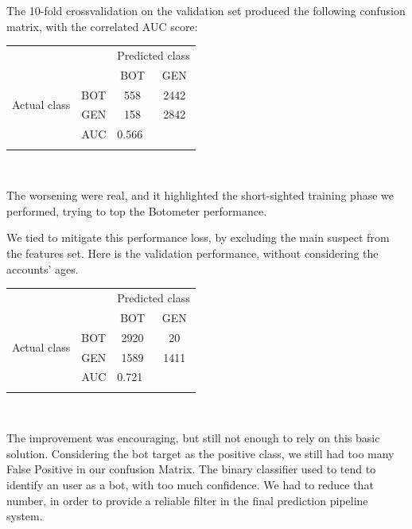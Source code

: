 The 10-fold crossvalidation on the validation set produced the following confusion matrix, with the correlated AUC score:\\

{
	\centering
	\begin{tabular}{@{}cc|cc@{}}
		\multicolumn{1}{c}{} &\multicolumn{1}{c}{} &\multicolumn{2}{c}{Predicted class} \\ 
		\multicolumn{1}{c}{} & 
		\multicolumn{1}{c|}{} & 
		\multicolumn{1}{c}{BOT} & 
		\multicolumn{1}{c}{GEN}  \\
		\cline{2-4}
		\multirow[c]{2}{*}{Actual class}
		& BOT  & 558 & 2442\\
		& GEN  & 158 & 2842\\
		\cline{2-4}
		\multicolumn{2}{r|}{AUC} & 
		\multicolumn{2}{l}{0.566}\\
		\multicolumn{4}{c}{}\\
	\end{tabular}\\
}
The worsening were real, and it highlighted the short-sighted training phase we performed, trying to top the Botometer performance.

We tied to mitigate this performance loss, by excluding the main suspect from the features set.
Here is the validation performance, without considering the accounts' ages.

{
\centering
\begin{tabular}{@{}cc|cc@{}}
	\multicolumn{1}{c}{} &\multicolumn{1}{c}{} &\multicolumn{2}{c}{Predicted class} \\ 
	\multicolumn{1}{c}{} & 
	\multicolumn{1}{c|}{} & 
	\multicolumn{1}{c}{BOT} & 
	\multicolumn{1}{c}{GEN}  \\
	\cline{2-4}
	\multirow[c]{2}{*}{Actual class}
	& BOT  & 2920 & 20\\
	& GEN  & 1589 & 1411\\
	\cline{2-4}
	\multicolumn{2}{r|}{AUC} & 
	\multicolumn{2}{l}{0.721}\\
	\multicolumn{4}{c}{}\\
\end{tabular}\\
}

The improvement was encouraging, but still not enough to rely on this basic solution.
Considering the bot target as the positive class, we still had too many False Positive in our confusion Matrix. The binary classifier used to tend to identify an user as a bot, with too much confidence. We had to reduce that number, in order to provide a reliable filter in the final prediction pipeline system.

